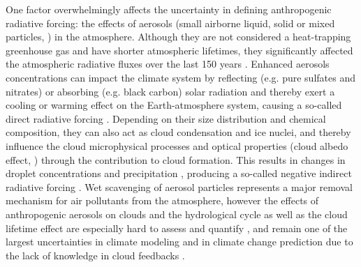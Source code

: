 One  factor   overwhelmingly  affects  the   uncertainty  in  defining
anthropogenic  radiative  forcing:  the  effects  of  aerosols  (small
airborne liquid,  solid or mixed  particles, \citealp{Putaud-2010}) in
the  atmosphere.  Although  they  are not  considered a  heat-trapping
greenhouse   gas  and   have  shorter   atmospheric   lifetimes,  they
significantly affected the atmospheric  radiative fluxes over the last
150    years   \citep{Koch-2009,   IPCC-2013}.     Enhanced   aerosols
concentrations can impact the climate system by reflecting (e.g.  pure
sulfates  and  nitrates)  or  absorbing  (e.g.   black  carbon)  solar
radiation  and  thereby exert  a  cooling  or  warming effect  on  the
Earth-atmosphere   system,  causing   a  so-called   direct  radiative
forcing     \citep{Charlson-1991,    Haywood-2000,    Ramanathan-2001,
Liao-2005,  Bangert-2012,  Lundgren-2013}.   Depending on  their  size
distribution  and chemical  composition, they  can also  act  as cloud
condensation  and   ice  nuclei,  and  thereby   influence  the  cloud
microphysical   processes  and   optical   properties  (cloud   albedo
effect,  \citealp{Twomey-1977})  through  the  contribution  to  cloud
formation.      This     results     in     changes     in     droplet
concentrations                \citep{Albrecht-1989}                and
precipitation     \citep{Rosenfeld-2000,    Khain-2008,    Khain-2009,
Pruppacher-2010,   Seifert-2012,  Tao-2012,  Lee-2012},   producing  a
so-called  negative  indirect  radiative forcing  \citep{Haywood-2000,
Lohmann-2005,  VandenHeever-2011, Rosenfeld-2013}.  Wet  scavenging of
aerosol  particles  represents  a  major  removal  mechanism  for  air
pollutants from  the atmosphere, however the  effects of anthropogenic
aerosols on  clouds and  the hydrological cycle  as well as  the cloud
lifetime    effect    are    especially    hard    to    assess    and
quantify   \citep{IPCC-2013},   and   remain   one  of   the   largest
uncertainties in climate modeling and in climate change prediction due
to  the lack  of  knowledge in  cloud feedbacks  \citep{Sherwood-2013,
Rosenfeld-2013, Lee-2013}.

